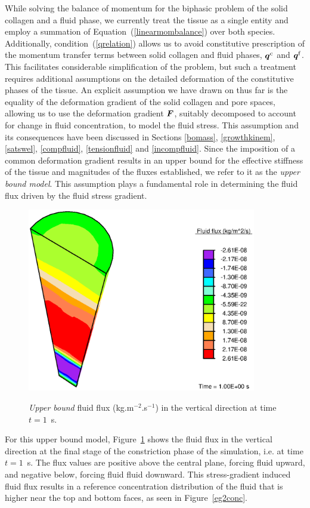 While solving the balance of momentum for the biphasic problem
of the solid collagen and a fluid phase, we currently treat the
tissue as a single entity and employ a summation of
Equation~(\ref{linearmombalance}) over both species. Additionally,
condition~(\ref{qrelation}) allows us to avoid constitutive
prescription of the momentum transfer terms between solid collagen and
fluid phases,
$\mbox{\boldmath$ q$}^\mathrm{c}$ and $\mbox{\boldmath$ q$}^\mathrm{f}$. This facilitates considerable
simplification of the 
problem, but such a treatment requires additional assumptions on the
detailed deformation of the constitutive phases of the tissue. An
explicit assumption we have drawn on thus far is the equality of
the deformation gradient of the solid collagen and pore spaces,
allowing us to use the deformation gradient
$\mbox{\boldmath$ F$}$, suitably decomposed to account for change in fluid
concentration, to model the fluid stress. This assumption and its 
consequences have been discussed in Sections \ref{bomass},
\ref{growthkinem}, \ref{satswel}, \ref{compfluid}, \ref{tensionfluid}
and \ref{incompfluid}. Since the imposition of a common deformation gradient
results in an upper bound for the 
effective stiffness of the tissue and magnitudes of the fluxes
established, we refer to it as the {\em upper bound model}. This
assumption plays a fundamental role in determining the fluid flux driven
by the fluid stress gradient.

\begin{figure}[ht]
  \centering
      {\includegraphics[width=10.00cm]{images/upper-bound-flux.eps}}
      \caption{{\em Upper bound} fluid flux (kg.m$^{-2}$.s$^{-1}$) in
        the vertical direction at time $t=1$~s.}
      \label{eg2flux}
\end{figure}

\noindent For this upper bound model, Figure~\ref{eg2flux} shows the fluid flux in
the vertical direction at the final stage of the constriction phase of
the simulation, i.e. at time $t=1$~s. The flux values are positive
above the central plane, forcing fluid upward, and negative below,
forcing fluid fluid downward. This stress-gradient induced fluid flux
results in a reference concentration distribution of the fluid that is
higher near the top and bottom faces, as seen in Figure~\ref{eg2conc}.

